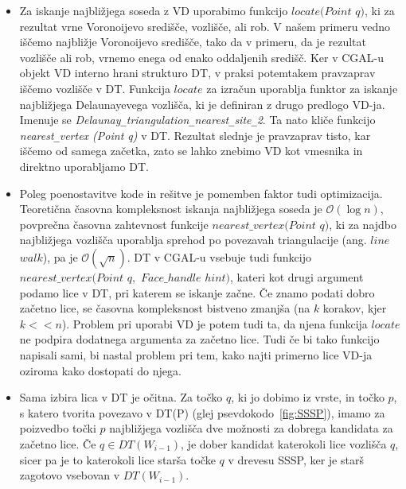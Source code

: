 \documentclass[a4paper, 12pt]{book}
\newcommand{\OO}{\ensuremath{\mathcal{O}}} %
\newcommand{\U}{\texttt{\_}}
\begin{document}
\begin{itemize}
\item Za iskanje najbližjega soseda z VD uporabimo funkcijo $locate(Point$ $q)$, ki za rezultat vrne Voronoijevo središče, vozlišče, ali rob. V našem primeru vedno iščemo najbližje Voronoijevo središče, tako da v primeru, da je rezultat vozlišče ali rob, vrnemo enega od enako oddaljenih središč. Ker v CGAL-u objekt VD interno hrani strukturo DT, v praksi potemtakem pravzaprav iščemo vozlišče v DT. Funkcija $locate$ za izračun uporablja funktor za iskanje najbližjega Delaunayevega vozlišča, ki je definiran z drugo predlogo VD-ja. Imenuje se \textit{Delaunay\U triangulation\U nearest\U site\U 2}. Ta nato kliče funkcijo \textit{nearest\U vertex (Point q)} v DT. Rezultat slednje je pravzaprav tisto, kar iščemo od samega začetka, zato se lahko znebimo VD kot vmesnika in direktno uporabljamo DT. 
\item Poleg poenostavitve kode in rešitve je pomemben faktor tudi optimizacija. Teoretična časovna kompleksnost iskanja najbližjega soseda je $\OO(\log n)$, povprečna časovna zahtevnost funkcije $nearest\U vertex(Point$ $q)$, ki za najdbo najbližjega vozlišča uporablja sprehod po povezavah triangulacije (ang. $line$ $walk$), pa je $\OO(\sqrt{n})$. DT v CGAL-u vsebuje tudi funkcijo $nearest\U vertex(Point$ $q,$ $Face\U handle$ $hint)$, kateri kot drugi argument podamo lice v DT, pri katerem se iskanje začne. Če znamo podati dobro začetno lice, se časovna kompleksnost bistveno zmanjša (na $k$ korakov, kjer $k << n$). Problem pri uporabi VD je potem tudi ta, da njena funkcija $locate$ ne podpira dodatnega argumenta za začetno lice. Tudi če bi tako funkcijo napisali sami, bi nastal problem pri tem, kako najti primerno lice VD-ja oziroma kako dostopati do njega. 
\item Sama izbira lica v DT je očitna. Za točko $q$, ki jo dobimo iz vrste, in točko $p$, s katero tvorita povezavo v DT(P) (glej psevdokodo~\ref{fig:SSSP}), imamo za poizvedbo točki $p$ najbližjega vozlišča dve možnosti za dobrega kandidata za začetno lice. Če $q\in DT(W_{i-1})$, je dober kandidat katerokoli lice vozlišča $q$, sicer pa je to katerokoli lice starša točke $q$ v drevesu SSSP, ker je starš zagotovo vsebovan v $DT(W_{i-1})$. 
\end{itemize}
\end{document}
